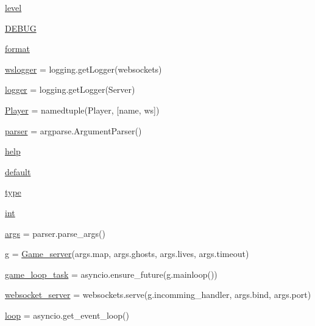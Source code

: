 \begin{DoxyCompactItemize}
\item 
\hyperlink{namespaceserver_a005764c00126daf80eaacfcc2451946c}{level}
\item 
\hyperlink{namespaceserver_a4f8abe5e41727de7cb88d5f2a826cdcb}{D\+E\+B\+UG}
\item 
\hyperlink{namespaceserver_addb76dcb1b81da9cf62eb9849b07211a}{format}
\item 
\hyperlink{namespaceserver_a520e79a10b246384fddda4381139cb5c}{wslogger} = logging.\+get\+Logger(\textquotesingle{}websockets\textquotesingle{})
\item 
\hyperlink{namespaceserver_abfa1d56012bc320e4b26361390f6fc24}{logger} = logging.\+get\+Logger(\textquotesingle{}Server\textquotesingle{})
\item 
\hyperlink{namespaceserver_a5de7d96778fa1c69916ba414cbf5b5bd}{Player} = namedtuple(\textquotesingle{}Player\textquotesingle{}, \mbox{[}\textquotesingle{}name\textquotesingle{}, \textquotesingle{}ws\textquotesingle{}\mbox{]})
\item 
\hyperlink{namespaceserver_aadab40bc4bd88b83c559fbe658ef25fc}{parser} = argparse.\+Argument\+Parser()
\item 
\hyperlink{namespaceserver_a692f59b384dd93287c366eb7e7c0608b}{help}
\item 
\hyperlink{namespaceserver_a70ecbc33459e4c393ccddd6f1d1bcc04}{default}
\item 
\hyperlink{namespaceserver_a72aa2cd67bf6ea46a0eea394a62534a2}{type}
\item 
\hyperlink{namespaceserver_a803365d66cd8c1e68f7e41a1837a59f4}{int}
\item 
\hyperlink{namespaceserver_aea7e1efc19535ee9bab8400a812b43a9}{args} = parser.\+parse\+\_\+args()
\item 
\hyperlink{namespaceserver_a9eff316f9603d6931577e565c3afeee3}{g} = \hyperlink{classserver_1_1_game__server}{Game\+\_\+server}(args.\+map, args.\+ghosts, args.\+lives, args.\+timeout)
\item 
\hyperlink{namespaceserver_ab163e79d5204d92c409ff4961e7f530d}{game\+\_\+loop\+\_\+task} = asyncio.\+ensure\+\_\+future(g.\+mainloop())
\item 
\hyperlink{namespaceserver_a6a73b8acab3526375057956cf76a1036}{websocket\+\_\+server} = websockets.\+serve(g.\+incomming\+\_\+handler, args.\+bind, args.\+port)
\item 
\hyperlink{namespaceserver_ac09871606862ea18f9b00501a0844fd5}{loop} = asyncio.\+get\+\_\+event\+\_\+loop()
\end{DoxyCompactItemize}


